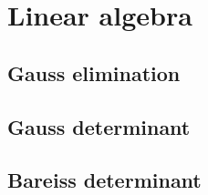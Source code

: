 \section{Linear algebra}

\subsection{Gauss elimination}

\subsection{Gauss determinant}

\subsection{Bareiss determinant}
